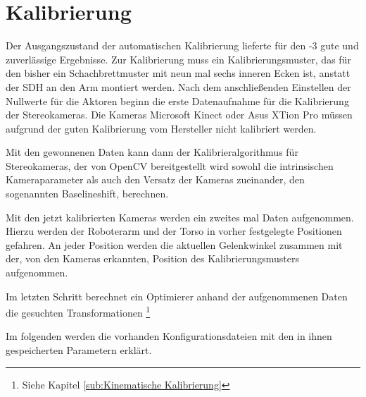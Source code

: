 \section{Kalibrierung}

Der Ausgangszustand der automatischen Kalibrierung lieferte für den -3
gute und zuverlässige Ergebnisse. Zur Kalibrierung muss ein
Kalibrierungsmuster, das für den \cob bisher ein Schachbrettmuster mit neun mal
sechs inneren Ecken \cite{opencv_chessboard} ist, anstatt der \ac{SDH} an
den Arm montiert werden. Nach dem anschließenden Einstellen der Nullwerte für
die Aktoren beginn die erste Datenaufnahme für die Kalibrierung der
Stereokameras. Die Kameras Microsoft Kinect oder Asus XTion Pro müssen aufgrund der
guten Kalibrierung vom Hersteller nicht kalibriert werden. 

Mit den gewonnenen Daten kann dann der Kalibrieralgorithmus für Stereokameras,
der von OpenCV bereitgestellt wird sowohl die intrinsischen Kameraparameter als
auch den Versatz der Kameras zueinander, den sogenannten Baselineshift,
berechnen.

Mit den jetzt kalibrierten Kameras werden ein zweites mal Daten aufgenommen.
Hierzu werden der Roboterarm und der Torso in vorher festgelegte Positionen
gefahren. An jeder Position werden die aktuellen Gelenkwinkel zusammen mit der,
von den Kameras erkannten, Position des Kalibrierungsmusters aufgenommen.

Im letzten Schritt berechnet ein Optimierer anhand der aufgenommenen Daten die
gesuchten Transformationen \footnote{Siehe Kapitel \ref{sub:Kinematische Kalibrierung}}\cite{Haug2012}



Im folgenden werden die vorhanden Konfigurationsdateien mit den in ihnen
gespeicherten Parametern erklärt.


